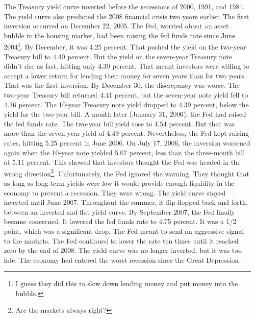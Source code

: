 The Treasury yield curve inverted before the recessions of 2000, 1991, and 1981. The yield curve also predicted the 2008 financial crisis two years earlier. The first inversion occurred on December 22, 2005. The Fed, worried about an asset bubble in the housing market, had been raising the fed funds rate since June 2004\footnote{I guess they did this to slow down lending money and put money into the bubble.}. By December, it was 4.25 percent. That pushed the yield on the two-year Treasury bill to 4.40 percent. But the yield on the seven-year Treasury note didn't rise as fast, hitting only 4.39 percent. That meant investors were willing to accept a lower return for lending their money for seven years than for two years. That was the first inversion. By December 30, the discrepancy was worse. The two-year Treasury bill returned 4.41 percent, but the seven-year note yield fell to 4.36 percent. The 10-year Treasury note yield dropped to 4.39 percent, below the yield for the two-year bill. A month later (January 31, 2006), the Fed had raised the fed funds rate. The two-year bill yield rose to 4.54 percent. But that was more than the seven-year yield of 4.49 percent. Nevertheless, the Fed kept raising rates, hitting 5.25 percent in June 2006. On July 17, 2006, the inversion worsened again when the 10-year note yielded 5.07 percent, less than the three-month bill at 5.11 percent. This showed that investors thought the Fed was headed in the wrong direction\footnote{Are the markets always right? }. Unfortunately, the Fed ignored the warning. They thought that as long as long-term yields were low it would provide enough liquidity in the economy to prevent a recession. They were wrong. The yield curve stayed inverted until June 2007. Throughout the summer, it flip-flopped back and forth, between an inverted and flat yield curve. By September 2007, the Fed finally became concerned. It lowered the fed funds rate to 4.75 percent. It was a 1/2 point, which was a significant drop. The Fed meant to send an aggressive signal to the markets. The Fed continued to lower the rate ten times until it reached zero by the end of 2008. The yield curve was no longer inverted, but it was too late. The economy had entered the worst recession since the Great Depression \citep{yield_inversion_balance}.


